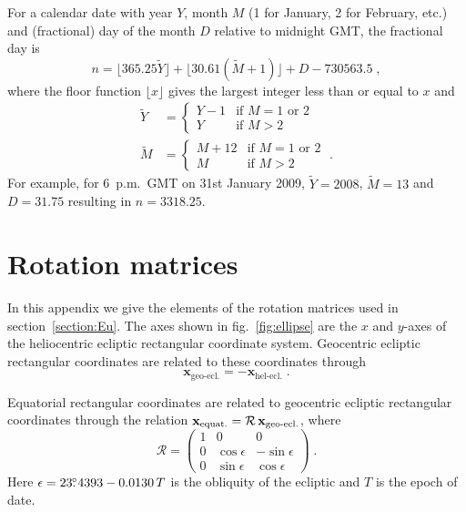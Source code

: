 \documentclass[preprintnumbers,a4paper,twocolumn,floats,nofootinbib,superscriptaddress,aps,prd]{revtex4-1}
\newcommand\fdg{\hbox{$.\!\!^\circ$}}
\begin{document}
For a calendar date with year $Y$, month $M$ (1 for January, 2 for February, etc.) and (fractional) day of the month $D$ relative to midnight GMT, the fractional day is~\cite{Meeus2000}
\begin{equation}
n=\lfloor 365.25 \tilde{Y}\rfloor+\lfloor30.61 (\tilde{M}+1)\rfloor+D-730563.5\;,
\end{equation}
where the floor function $\lfloor x \rfloor$ gives the largest integer less than or equal to $x$ and
\begin{align}
\tilde{Y} &=
  \begin{cases}
   Y-1 & \text{if } M=1\text{ or }2 \\
   Y       & \text{if } M >2
  \end{cases}\\
  \tilde{M} &=
  \begin{cases}
   M+12 & \text{if } M=1\text{ or }2 \\
   M       & \text{if } M >2
  \end{cases}\;.
\end{align}
For example, for 6~p.m.\ GMT on 31st January 2009, $\tilde{Y}=2008$, $\tilde{M}=13$ and $D=31.75$ resulting in $n=3318.25$. 

\section{Rotation matrices}
\label{app:rotation}
In this appendix we give the elements of the rotation matrices used in section~\ref{section:Eu}. The axes shown in fig.~\ref{fig:ellipse} are the $x$ and $y$-axes of the heliocentric ecliptic rectangular coordinate system. Geocentric ecliptic rectangular coordinates are related to these coordinates through~\cite{AA2014}
\begin{equation}
\mathbf{x}_{\text{geo-ecl.}}=-\mathbf{x}_{\text{hel-ecl.}}\;.
\end{equation}

Equatorial rectangular coordinates are related to geocentric ecliptic rectangular coordinates through the relation \mbox{$\mathbf{x}_{\rm{equat.}}=\mathcal{R}\,\mathbf{x}_{\text{geo-ecl.}}$}, where~\cite{AA2014}
\begin{equation}
\mathcal{R}=
 \begin{pmatrix}
1 &0 & 0 \\
0 & \cos \epsilon  &-\sin\epsilon \\
 0 & \sin \epsilon  & \cos \epsilon
 \end{pmatrix}\;.
\end{equation}
Here $\epsilon=23\fdg4393-0.0130 \,T$ is the obliquity of the ecliptic and $T$ is the epoch of date.
\end{document}
